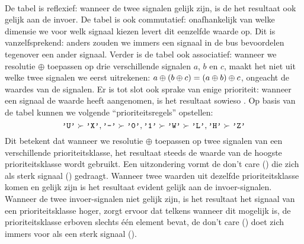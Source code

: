 \paragraph{}
De tabel is reflexief: wanneer de twee signalen gelijk zijn, is de het resultaat ook gelijk aan de invoer. De tabel is ook commutatief: onafhankelijk van welke dimensie we voor welk signaal kiezen levert dit eenzelfde waarde op. Dit is vanzelfsprekend: anders zouden we immers een signaal in de bus bevoordelen tegenover een ander signaal. Verder is de tabel ook associatief: wanneer we resolutie $\oplus$ toepassen op drie verschillende signalen $a$, $b$ en $c$, maakt het niet uit welke twee signalen we eerst uitrekenen: $a\oplus\left( b\oplus c \right)=\left( a\oplus b \right)\oplus c$, ongeacht de waardes van de signalen. Er is tot slot ook sprake van enige prioriteit: wanneer een signaal de waarde  heeft aangenomen, is het resultaat sowieso . Op basis van de tabel kunnen we volgende ``prioriteitsregels'' opstellen:
\begin{equation}
\vhdltermen{'U'}\succ\vhdltermen{'X'},\vhdltermen{'-'}\succ\vhdltermen{'0'},\vhdltermen{'1'}\succ\vhdltermen{'W'}\succ\vhdltermen{'L'},\vhdltermen{'H'}\succ\vhdltermen{'Z'}
\eqnlab{stdlogic-priority}
\end{equation}
Dit betekent dat wanneer we resolutie $\oplus$ toepassen op twee signalen van een verschillende prioriteitsklasse, het resultaat steeds de waarde van de hoogste prioriteitsklasse wordt gebruikt. Een uitzondering vormt de don't care () die zich als sterk signaal () gedraagt. Wanneer twee waarden uit dezelfde prioriteitsklasse komen en gelijk zijn is het resultaat evident gelijk aan de invoer-signalen. Wanneer de twee invoer-signalen niet gelijk zijn, is het resultaat het signaal van een prioriteitsklasse hoger,  zorgt ervoor dat telkens wanneer dit mogelijk is, de prioriteitsklasse erboven slechts \'e\'en element bevat, de don't care () doet zich immers voor als een sterk signaal ().

